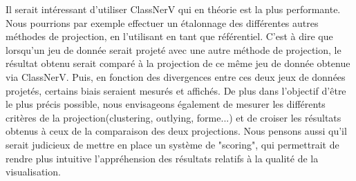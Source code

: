 Il serait intéressant d'utiliser ClassNerV qui en théorie est la plus performante. Nous pourrions par exemple 
effectuer un étalonnage des différentes autres méthodes de projection, en l'utilisant en tant que référentiel. 
C'est à dire que lorsqu'un jeu de donnée serait projeté avec une autre méthode de projection, le résultat obtenu serait comparé à la projection de ce même jeu de donnée obtenue via ClassNerV.
Puis, en fonction des divergences entre ces deux jeux de données projetés, certains biais seraient mesurés et affichés.
De plus dans l'objectif d'être le plus précis possible, nous envisageons également de mesurer les différents critères de la projection(clustering, outlying, forme...) et de croiser les résultats obtenus à ceux de la comparaison des deux projections.
Nous pensons aussi qu'il serait judicieux de mettre en place un système de "scoring", qui permettrait de rendre plus intuitive l'appréhension des résultats relatifs à la qualité de la visualisation. 

